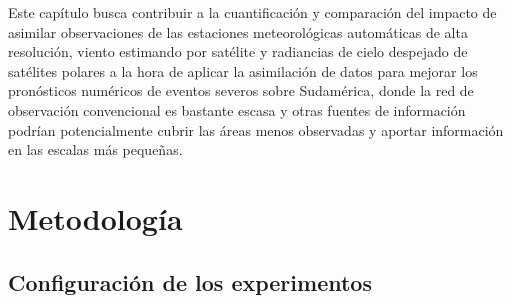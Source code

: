 \documentclass[12pt,oneside,a4paper]{reedthesis}
\begin{document}
Este capítulo busca contribuir a la cuantificación y comparación del impacto de asimilar observaciones de las estaciones meteorológicas automáticas de alta resolución, viento estimando por satélite y radiancias de cielo despejado de satélites polares a la hora de aplicar la asimilación de datos para mejorar los pronósticos numéricos de eventos severos sobre Sudamérica, donde la red de observación convencional es bastante escasa y otras fuentes de información podrían potencialmente cubrir las áreas menos observadas y aportar información en las escalas más pequeñas.

\hypertarget{metodologuxeda}{%
\section{Metodología}\label{metodologuxeda}}

\hypertarget{config}{%
\subsection{Configuración de los experimentos}\label{config}}
\end{document}
